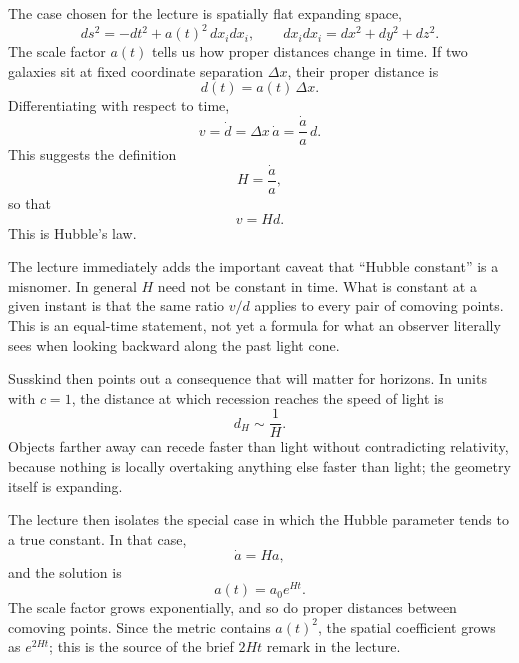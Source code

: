 The case chosen for the lecture is spatially flat expanding space,
\begin{equation}
ds^2=-dt^2+a(t)^2\,dx_i dx_i,
\qquad
dx_i dx_i = dx^2+dy^2+dz^2.
\end{equation}
The scale factor \(a(t)\) tells us how proper distances change in time. If two galaxies sit at fixed coordinate separation \(\Delta x\), their proper distance is
\begin{equation}
d(t)=a(t)\,\Delta x.
\end{equation}
Differentiating with respect to time,
\begin{equation}
v=\dot d=\Delta x\,\dot a=\frac{\dot a}{a}\,d.
\end{equation}
This suggests the definition
\begin{equation}
H=\frac{\dot a}{a},
\end{equation}
so that
\begin{equation}
v=Hd.
\end{equation}
This is Hubble's law.

The lecture immediately adds the important caveat that ``Hubble constant'' is a misnomer. In general \(H\) need not be constant in time. What is constant at a given instant is that the same ratio \(v/d\) applies to every pair of comoving points. This is an equal-time statement, not yet a formula for what an observer literally sees when looking backward along the past light cone.

Susskind then points out a consequence that will matter for horizons. In units with \(c=1\), the distance at which recession reaches the speed of light is
\begin{equation}
d_H \sim \frac{1}{H}.
\end{equation}
Objects farther away can recede faster than light without contradicting relativity, because nothing is locally overtaking anything else faster than light; the geometry itself is expanding.

The lecture then isolates the special case in which the Hubble parameter tends to a true constant. In that case,
\begin{equation}
\dot a = Ha,
\end{equation}
and the solution is
\begin{equation}
a(t)=a_0 e^{Ht}.
\end{equation}
The scale factor grows exponentially, and so do proper distances between comoving points. Since the metric contains \(a(t)^2\), the spatial coefficient grows as \(e^{2Ht}\); this is the source of the brief \(2Ht\) remark in the lecture.

